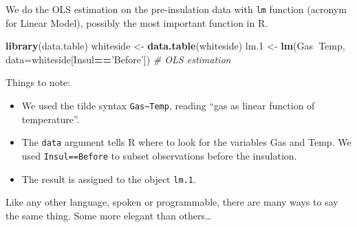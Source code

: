 \documentclass[]{book}
\newenvironment{Shaded}{\begin{snugshade}}{\end{snugshade}}
\newcommand{\CommentTok}[1]{\textcolor[rgb]{0.56,0.35,0.01}{\textit{#1}}}
\newcommand{\DataTypeTok}[1]{\textcolor[rgb]{0.13,0.29,0.53}{#1}}
\newcommand{\FloatTok}[1]{\textcolor[rgb]{0.00,0.00,0.81}{#1}}
\newcommand{\KeywordTok}[1]{\textcolor[rgb]{0.13,0.29,0.53}{\textbf{#1}}}
\newcommand{\NormalTok}[1]{#1}
\newcommand{\OperatorTok}[1]{\textcolor[rgb]{0.81,0.36,0.00}{\textbf{#1}}}
\newcommand{\StringTok}[1]{\textcolor[rgb]{0.31,0.60,0.02}{#1}}
\providecommand{\tightlist}{%
  \setlength{\itemsep}{0pt}\setlength{\parskip}{0pt}}
\theoremstyle{definition}
\theoremstyle{definition}
\theoremstyle{definition}
\theoremstyle{remark}
\begin{document}
We do the OLS estimation on the pre-insulation data with \texttt{lm} function (acronym for Linear Model), possibly the most important function in R.

\begin{Shaded}
\begin{Highlighting}[]
\KeywordTok{library}\NormalTok{(data.table)}
\NormalTok{whiteside <-}\StringTok{ }\KeywordTok{data.table}\NormalTok{(whiteside)}
\NormalTok{lm}\FloatTok{.1}\NormalTok{ <-}\StringTok{ }\KeywordTok{lm}\NormalTok{(Gas}\OperatorTok{~}\NormalTok{Temp, }\DataTypeTok{data=}\NormalTok{whiteside[Insul}\OperatorTok{==}\StringTok{'Before'}\NormalTok{]) }\CommentTok{# OLS estimation }
\end{Highlighting}
\end{Shaded}

Things to note:

\begin{itemize}
\tightlist
\item
  We used the tilde syntax \texttt{Gas\textasciitilde{}Temp}, reading ``gas as linear function of temperature''.
\item
  The \texttt{data} argument tells R where to look for the variables Gas and Temp.
  We used \texttt{Insul==\textquotesingle{}Before\textquotesingle{}} to subset observations before the insulation.
\item
  The result is assigned to the object \texttt{lm.1}.
\end{itemize}

Like any other language, spoken or programmable, there are many ways to say the same thing. Some more elegant than others\ldots{}

\begin{Shaded}
\end{Shaded}
\end{document}
